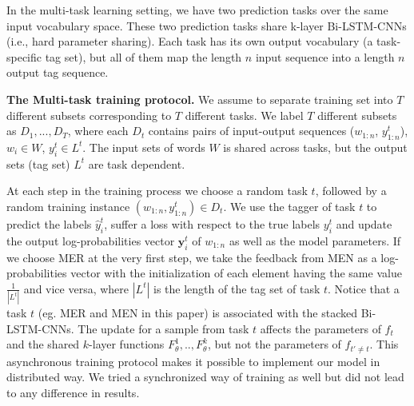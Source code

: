 In the multi-task learning setting, we have two prediction tasks over the same input vocabulary space. These two prediction tasks share k-layer Bi-LSTM-CNNs (i.e., hard parameter sharing). Each task has
its own output vocabulary (a task-specific tag set), but all of them map the length $n$ input sequence into a length $n$ output tag sequence.

\textbf{The Multi-task training protocol.} 
We assume to separate training set into $T$ different subsets corresponding to $T$ different tasks. We label $T$ different subsets as  $D_1, ..., D_T$, where
each $D_t$ contains pairs of input-output sequences ($w_{1:n}$, $y_{1:n}^t$), $w_i \in W$, $y_i^t \in L^t$. The input sets of words $W$ is shared across tasks, but the output sets (tag set) $L^t$ are task dependent.

At each step in the training process we choose a random task $t$, followed by a random training instance $(w_{1:n}, y_{1:n}^t)\in D_t$. We use the tagger of task $t$ to predict the labels $\hat{y}_i^t$, suffer a loss with respect to the true labels $y_i^t$ and update the output log-probabilities vector $\mathbf{y}_i^t$ of $w_{1:n}$ as well as the model parameters. 
If we choose MER at the very first step, we take the feedback from MEN as a log-probabilities vector with the initialization of each element having the same value $\frac{1}{|L^t|}$ and vice versa, where $|L^t|$ is the length of the tag set of task $t$.
Notice that a task $t$ (eg. MER and MEN in this paper) is associated with the stacked Bi-LSTM-CNNs. The update for a sample from task $t$ affects the parameters of $f_t$ and the shared $k$-layer functions $F_{\theta}^1, .., F_{\theta}^k$, but not the parameters of $f_{{t}'\neq t}$.
This asynchronous training protocol makes it possible to implement our model in distributed way.
We tried a synchronized way of training as well but did not lead to any difference in results. 
